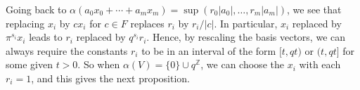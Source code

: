\documentclass[12pt,a4paper]{article}
\theoremstyle{plain}
\theoremstyle{definition}
\theoremstyle{remark}
\newcommand{\bZ}{\mathbb{Z}}
\begin{document}
Going back to $\alpha(a_0 x_0 + \cdots + a_m x_m) = \sup(r_0|a_0|, \ldots, r_m|a_m|)$, we see that replacing $x_i$ by $c x_i$ for $c \in F$ replaces $r_i$ by $r_i/|c|$. In particular, $x_i$ replaced by $\pi^{s_i} x_i$ leads to $r_i$ replaced by $q^{s_i} r_i$. Hence, by rescaling the basis vectors, we can always require the constants $r_i$ to be in an interval of the form $[t, qt)$ or $(t, qt]$ for some given $t > 0$. So when $\alpha(V) = \{0\} \cup q^{\bZ}$, we can choose the $x_i$ with each $r_i = 1$, and this gives the next proposition.
\end{document}

